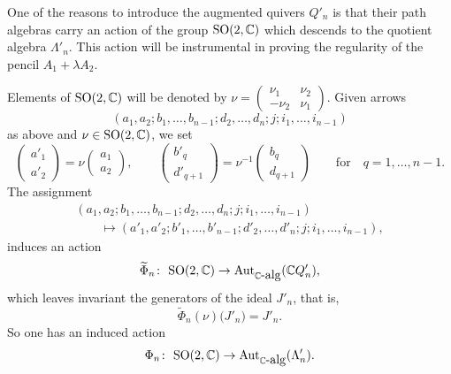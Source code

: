 One of the reasons to introduce the augmented quivers $Q'_{n}$ is that their path algebras carry
an action of the group ${\rm SO}(2, \mathbb{C})$ which descends to the quotient algebra $\Lambda'_{n}$. This
action will be instrumental in proving the regularity of the pencil $A_1 + \lambda A_2$.

Elements of ${\rm SO}(2, \mathbb{C})$ will be denoted by $\nu= \left(\begin{smallmatrix} \nu_1 & \nu_2 \\ -\nu_2 & \nu_1\end{smallmatrix}\right)$. Given arrows
\[(a_{1},a_{2};b_{1},\dots,b_{n-1};d_{2},\dots,d_{n};j;i_{1},\dots,i_{n-1})\]
as above and $\nu\in {\rm SO}(2,\mathbb{C})$, we set
\begin{equation*}
\begin{pmatrix}a'_{1} \\ a'_{2} \end{pmatrix} = \nu \begin{pmatrix}a_{1} \\ a_{2} \end{pmatrix},
\qquad
\begin{pmatrix}b'_{q} \\ d'_{q+1} \end{pmatrix} = \nu^{-1}\begin{pmatrix}b_{q} \\ d_{q+1} \end{pmatrix}
\qquad\text{for}\quad q=1,\dots,n-1 .
\end{equation*}
The assignment
\begin{gather*}
(a_{1},a_{2};b_{1},\dots,b_{n-1};d_{2},\dots,d_{n};j;i_{1},\dots,i_{n-1}) \\ \qquad{} \longmapsto(a'_{1},a'_{2};b'_{1},\dots,b'_{n-1};d'_{2},\dots,d'_{n};j;i_{1},\dots,i_{n-1}) ,
\end{gather*}
induces an action
\[\widetilde\Phi_n \colon \ {\rm SO}(2,\mathbb{C}) \to \operatorname{Aut}_{\mathbb{C}\hbox{-alg}} (\mathbb{C} Q'_{n}) ,\]
which leaves invariant the generators of the ideal $J'_{n}$, that is,
\begin{equation*}
\widetilde{\Phi}_{n} (\nu) \bigl(J'_{n}\bigr) =J'_{n} .
\end{equation*}
So one has an induced action
\[\Phi_n \colon \ {\rm SO}(2,\mathbb{C}) \to \operatorname{Aut}_{\mathbb{C}\hbox{-alg}} (\Lambda'_{n}) .\]

